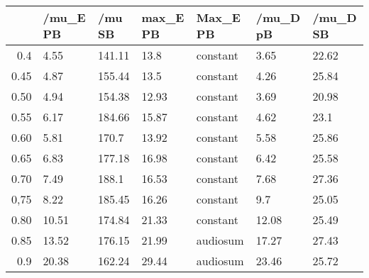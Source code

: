 \begin{table}[ht]
\centering
\begin{tabular}{rllllll}
  \hline
 & /mu\_E PB & /mu SB & max\_E PB & Max\_E PB & /mu\_D pB & /mu\_D SB \\ 
  \hline
0.4 & 4.55 & 141.11 & 13.8 & constant & 3.65 & 22.62 \\ 
  0.45 & 4.87 & 155.44 & 13.5 & constant & 4.26 & 25.84 \\ 
  0.50 & 4.94 & 154.38 & 12.93 & constant & 3.69 & 20.98 \\ 
  0.55 & 6.17 & 184.66 & 15.87 & constant & 4.62 & 23.1 \\ 
  0.60 & 5.81 & 170.7 & 13.92 & constant & 5.58 & 25.86 \\ 
  0.65 & 6.83 & 177.18 & 16.98 & constant & 6.42 & 25.58 \\ 
  0.70 & 7.49 & 188.1 & 16.53 & constant & 7.68 & 27.36 \\ 
  0,75 & 8.22 & 185.45 & 16.26 & constant & 9.7 & 25.05 \\ 
  0.80 & 10.51 & 174.84 & 21.33 & constant & 12.08 & 25.49 \\ 
  0.85 & 13.52 & 176.15 & 21.99 & audiosum & 17.27 & 27.43 \\ 
  0.9 & 20.38 & 162.24 & 29.44 & audiosum & 23.46 & 25.72 \\ 
   \hline
\end{tabular}
\end{table}
